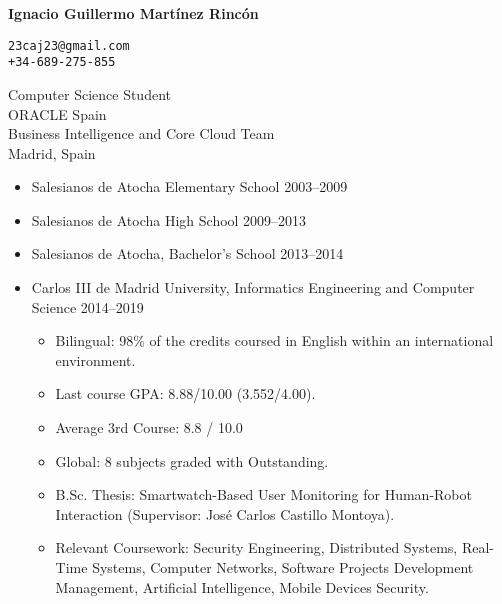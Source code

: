 \documentclass[11pt]{article}
\renewcommand{\section}[1]
{\vspace{1.0\baselineskip}{\Large\textbf{#1}}}
\begin{document}

\thispagestyle{empty}

\parbox[c][0.5in]{3.4in}{\huge \textbf{Ignacio Guillermo Martínez Rincón}}
\parbox[c][0.5in]{2.5in}{%
\small
\vspace{17ex}
\texttt{23caj23@gmail.com \\ +34-689-275-855}
}

Computer Science Student \\
ORACLE Spain \\
Business Intelligence and Core Cloud Team \\
Madrid, Spain

\section{Education}

\begin{itemize}[leftmargin=12pt]
  \item[] Salesianos de Atocha Elementary School \hfill 2003--2009
  \item[] Salesianos de Atocha High School \hfill 2009--2013
  \item[] Salesianos de Atocha, Bachelor's School \hfill 2013--2014
  \item[] Carlos III de Madrid University, Informatics Engineering and Computer Science \hfill 2014--2019
  \begin{itemize}
      \item Bilingual: 98\% of the credits coursed in English within an international environment.
      \item Last course GPA: 8.88/10.00 (3.552/4.00).
      \item Average 3rd Course: 8.8 / 10.0
      \item Global: 8 subjects graded with Outstanding.
      \item B.Sc. Thesis: Smartwatch-Based User Monitoring for Human-Robot Interaction (Supervisor: José Carlos Castillo Montoya).
      \item Relevant Coursework: Security Engineering, Distributed Systems, Real-Time Systems, Computer Networks, Software Projects Development Management, Artificial Intelligence, Mobile Devices Security.
  \end{itemize}
\end{itemize}

\section{Employment}
\end{document}
